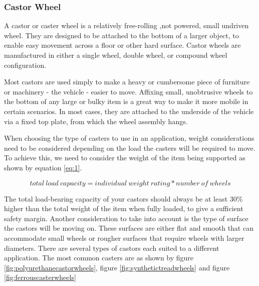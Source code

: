 \subsubsection{Castor Wheel}

A castor or caster wheel is a relatively free-rolling ,not powered, small undriven wheel.
They are designed to be attached to the bottom of a larger object, to enable easy movement across a floor or other hard surface.
Castor wheels are manufactured in either a single wheel, double wheel, or compound wheel configuration.
\par
Most castors are used simply to make a heavy or cumbersome piece of furniture or machinery - the vehicle - easier to move.
Affixing small, unobtrusive wheels to the bottom of any large or bulky item is a great way to make it more mobile in certain scenarios.
In most cases, they are attached to the underside of the vehicle via a fixed top plate, from which the wheel assembly hangs.
\par
When choosing the type of casters to use in an application, weight considerations need to be considered depending on the load the casters will be required to move.
To achieve this, we need to consider the weight of the item being supported as shown by equation \ref{eq:1}.

\begin{equation}
\label{eq:1}
total\:load\:capacity = individual\:weight\:rating * number\:of\:wheels
\end{equation}

The total load-bearing capacity of your castors should always be at least 30\% higher than the total weight of the item when fully loaded, to give a sufficient safety margin.
Another consideration to take into account is the type of surface the castors will be moving on.
These surfaces are either flat and smooth that can accommodate small wheels or rougher surfaces that require wheels with larger diameters.
There are several types of castors each suited to a different application.
The most common casters are as shown by figure \ref{fig:polyurethanecastorwheels}, figure \ref{fig:synthetictreadwheels} and figure \ref{fig:ferrouscasterwheels}

